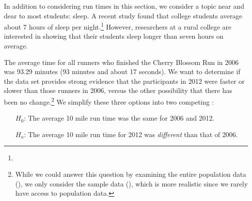 In addition to considering run times in this section, we consider a topic near and dear to most students: sleep. A recent study found that college students average about 7 hours of sleep per night.\footnote{} However, researchers at a rural college are interested in showing that their students sleep longer than seven hours on average. 


The average time for all runners who finished the Cherry Blossom Run in 2006 was 93.29 minutes (93 minutes and about 17 seconds). We want to determine if the  data set provides strong evidence that the participants in 2012 were faster or slower than those runners in 2006, versus the other possibility that there has been no change.\footnote{While we could answer this question by examining the entire population data (), we only consider the sample data (), which is more realistic since we rarely have access to population data.} We simplify these three options into two competing :
\begin{itemize}
\setlength{\itemsep}{0mm}
\item[$H_0$:] The average 10 mile run time was the same for 2006 and 2012.
\item[$H_a$:] The average 10 mile run time for 2012 was \emph{different} than that of 2006.
\end{itemize}

%




